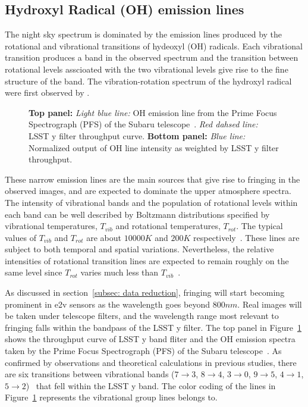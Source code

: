 \documentclass[twocolumn]{aastex63} %
\begin{document}
\begin{CJK*}{UTF8}{gbsn}
\subsection{Hydroxyl Radical (OH) emission lines}\label{sec: OH line + y filter}
 The night sky spectrum is dominated by the emission lines produced by the rotational and vibrational transitions of hydeoxyl (OH) radicals. Each vibrational transition produces a band in the observed spectrum and the transition between rotational levels asscioated with the two vibrational levels give rise to the fine structure of the band. The vibration-rotation spectrum of the hydroxyl radical were first observed by \citet{Meinel50a,Meinel50b}.
\begin{figure}[htb]
\centering
{}
\caption{\textbf{Top panel:} {\it Light blue line:} OH emission line from the Prime Focus Spectrograph (PFS) of the Subaru telescope~\citep{Tamura16}. {\it Red dahsed line:} LSST y filter throughput curve. 
\textbf{Bottom panel:} {\it Blue line:} Normalized output of OH line intensity as weighted by LSST y filter throughput.}
\label{fig:OH_spec}
\end{figure}
These narrow emission lines are the main sources that give rise to fringing in the observed images, and are expected to dominate the upper atmosphere spectra. The intensity of vibrational bands and the population of rotational levels within each band can be well described by Boltzmann distributions specified by vibrational temperatures, $T_{vib}$ and rotational temperatures, $T_{rot}$. The typical values of $T_{vib}$ and $T_{rot}$ are about $10000K$ and $200K$ respectively~\citep{Rousselot00}. These lines are subject to both temporal and spatial variations.  Nevertheless, the relative intensities of rotational transition lines are expected to remain roughly on the same level since $T_{rot}$ varies much less than $T_{vib}$~\citep{Noll15,Hart19}.

As discussed in section~\ref{subsec: data reduction}, fringing will start becoming prominent in e2v sensors as the wavelength goes beyond $800nm$. Real images will be taken under telescope filters, and the wavelength range most relevant to fringing falls within the bandpass of the LSST y filter. The top panel in Figure~\ref{fig:OH_spec} shows the throughput curve of LSST y band fliter and the OH emission spectra taken by the Prime Focus Spectrograph (PFS) \citep{rlh} of the Subaru telescope~\citep{Tamura16}. As confirmed by observations and theoretical calculations in previous studies, there are six transitions between vibrational bands ($7\rightarrow 3$, $8\rightarrow4$, $3\rightarrow0$, $9\rightarrow5$, $4\rightarrow1$, $5\rightarrow2$)~\citep{Noll15,Osterbrock96,Osterbrock97,Rousselot00} that fell within the LSST y band. The color coding of the lines in Figure~\ref{fig:OH_spec} represents the vibrational group lines belongs to. 


\end{CJK*}
\end{document}
